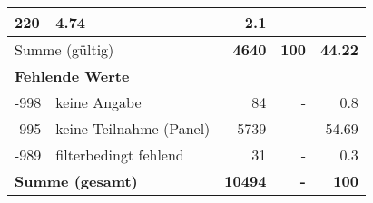 \begin{longtable}{lXrrr}
       \num{220} &
       \num[round-mode=places,round-precision=2]{4.74} &
         \num[round-mode=places,round-precision=2]{2.1} \\
     \midrule
     \multicolumn{2}{l}{Summe (gültig)} &
       \textbf{\num{4640}} &
     \textbf{\num{100}} &
       \textbf{\num[round-mode=places,round-precision=2]{44.22}} \\
     \multicolumn{5}{l}{\textbf{Fehlende Werte}}\\
       -998 &
       keine Angabe &
         \num{84} &
        - &
         \num[round-mode=places,round-precision=2]{0.8} \\
       -995 &
       keine Teilnahme (Panel) &
         \num{5739} &
        - &
         \num[round-mode=places,round-precision=2]{54.69} \\
       -989 &
       filterbedingt fehlend &
         \num{31} &
        - &
         \num[round-mode=places,round-precision=2]{0.3} \\
     \midrule
     \multicolumn{2}{l}{\textbf{Summe (gesamt)}} &
          \textbf{\num{10494}} &
        \textbf{-} &
        \textbf{\num{100}} \\
     \bottomrule
     \end{longtable}
     
